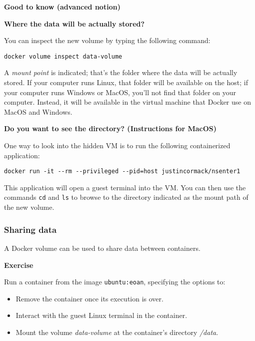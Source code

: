 \documentclass[
]{article}
\providecommand{\tightlist}{%
  \setlength{\itemsep}{0pt}\setlength{\parskip}{0pt}}
\newenvironment{infobox}[1]
  {
  \begin{itemize}
  \renewcommand{\labelitemi}{
    \raisebox{-.7\height}[0pt][0pt]{
      
    }
  }
  \setlength{\fboxsep}{1em}
  \begin{whitebox}
  \item
  }
  {
  \end{whitebox}
  \end{itemize}
  }
\theoremstyle{definition}
\theoremstyle{definition}
\theoremstyle{definition}
\theoremstyle{remark}
\let\BeginKnitrBlock\begin \let\EndKnitrBlock\end
\begin{document}
\begin{infobox}{curiosity}

\textbf{Good to know (advanced notion)}

\textbf{Where the data will be actually stored?}

You can inspect the new volume by typing the
following command:

\begin{verbatim}
docker volume inspect data-volume
\end{verbatim}

A \emph{mount point} is indicated; that's the folder where the data
will be actually stored.
If your computer runs Linux, that folder will be available
on the host; if your computer runs Windows or MacOS,
you'll not find that folder on your computer.
Instead, it will be available in the virtual machine
that Docker use on MacOS and Windows.

\textbf{Do you want to see the directory? (Instructions for MacOS)}

One way to look into the hidden VM is to run
the following containerized application:

\begin{verbatim}
docker run -it --rm --privileged --pid=host justincormack/nsenter1
\end{verbatim}

This application will open a guest terminal into the VM.
You can then use the commands \texttt{cd} and \texttt{ls}
to browse to the directory indicated as the mount path
of the new volume.

\end{infobox}

\hypertarget{sharing-data}{%
\subsubsection{Sharing data}\label{sharing-data}}

A Docker volume can be used to share data between containers.

\begin{infobox}{exercisebox}

\textbf{Exercise}

\BeginKnitrBlock{exercise}
\protect\hypertarget{exr:unnamed-chunk-26}{}{\label{exr:unnamed-chunk-26} }Run a container from the image \texttt{ubuntu:eoan},
specifying the options to:

\begin{itemize}
\item
  Remove the container once its execution is over.
\item
  Interact with the guest Linux terminal in the container.
\end{itemize}

\begin{itemize}
\tightlist
\item
  Mount the volume \emph{data-volume} at the container's directory \emph{/data}.
\end{itemize}
\EndKnitrBlock{exercise}

\end{infobox}
\end{document}
